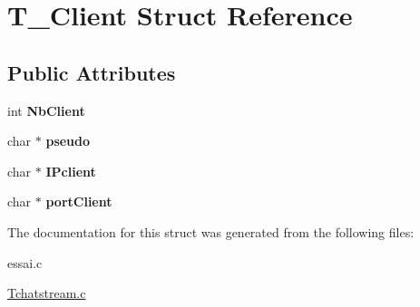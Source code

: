 \hypertarget{struct_t___client}{}\section{T\+\_\+\+Client Struct Reference}
\label{struct_t___client}
\subsection*{Public Attributes}
\begin{DoxyCompactItemize}
\item 
\mbox{\label{struct_t___client_a37311cdecddea203b6856f2e9120cf32}} 
int {\bfseries Nb\+Client}
\item 
\mbox{\label{struct_t___client_aa3f3ad3f2eaa285e098e19a3800c9ecc}} 
char $\ast$ {\bfseries pseudo}
\item 
\mbox{\label{struct_t___client_ae23acc3d90699e37a485e898a4465c6b}} 
char $\ast$ {\bfseries I\+Pclient}
\item 
\mbox{\label{struct_t___client_a6d96a375cc128bad3093f9274b1a9314}} 
char $\ast$ {\bfseries port\+Client}
\end{DoxyCompactItemize}


The documentation for this struct was generated from the following files\+:\begin{DoxyCompactItemize}
\item 
essai.\+c\item 
\hyperlink{_tchatstream_8c}{Tchatstream.\+c}\end{DoxyCompactItemize}
